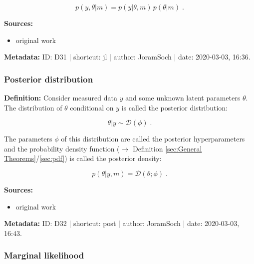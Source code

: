\documentclass[a4paper,12pt]{book}
\begin{document}
\begin{equation} \label{eq:jl-jl}
p(y,\theta|m) = p(y|\theta,m) \, p(\theta|m) \; .
\end{equation}

\vspace{1em}
\textbf{Sources:}
\begin{itemize}
\item original work\end{itemize}


\vspace{1em}
\textbf{Metadata:} ID: D31 | shortcut: jl | author: JoramSoch | date: 2020-03-03, 16:36.


\subsubsection[\textit{Posterior distribution}]{Posterior distribution} \label{sec:post}

\vspace{1em}
\textbf{Definition:} Consider measured data $y$ and some unknown latent parameters $\theta$. The distribution of $\theta$ conditional on $y$ is called the posterior distribution:

\begin{equation} \label{eq:post-post}
\theta|y \sim \mathcal{D}(\phi) \; .
\end{equation}

The parameters $\phi$ of this distribution are called the posterior hyperparameters and the probability density function ($\rightarrow$ Definition \ref{sec:General Theorems}/\ref{sec:pdf}) is called the posterior density:

\begin{equation} \label{eq:post-prior-pdf}
p(\theta|y,m) = \mathcal{D}(\theta; \phi) \; .
\end{equation}

\vspace{1em}
\textbf{Sources:}
\begin{itemize}
\item original work\end{itemize}


\vspace{1em}
\textbf{Metadata:} ID: D32 | shortcut: post | author: JoramSoch | date: 2020-03-03, 16:43.


\subsubsection[\textit{Marginal likelihood}]{Marginal likelihood} \label{sec:ml}
\end{document}
